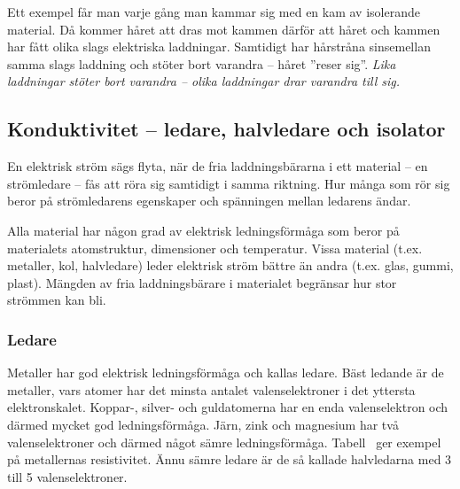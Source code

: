 Ett exempel får man varje gång man kammar sig med en kam av isolerande material.
Då kommer håret att dras mot kammen därför att håret och kammen har
fått olika slags elektriska laddningar.
Samtidigt har hårstråna sinsemellan samma slags laddning och stöter bort
varandra -- håret ''reser sig''.
\emph{Lika laddningar stöter bort varandra -- olika laddningar drar varandra till sig.}

\subsection{Konduktivitet -- ledare, halvledare och isolator}
\label{konduktivitet}

En elektrisk ström sägs flyta, när de fria laddningsbärarna i ett material -- en
strömledare -- fås att röra sig samtidigt i samma riktning.
Hur många som rör sig beror på strömledarens egenskaper och spänningen mellan
ledarens ändar.

Alla material har någon grad av elektrisk ledningsförmåga som beror på
materialets atomstruktur, dimensioner och temperatur.
Vissa material (t.ex. metaller, kol, halvledare) leder elektrisk ström bättre
än andra (t.ex. glas, gummi, plast).
Mängden av fria laddningsbärare i materialet begränsar hur stor strömmen kan
bli.

\subsubsection{Ledare}
\label{ledare}

Metaller har god elektrisk ledningsförmåga och kallas ledare.
Bäst ledande är de metaller, vars atomer har det minsta antalet
valenselektroner i det yttersta elektronskalet.
Koppar-, silver- och guldatomerna har en enda valenselektron och därmed mycket
god ledningsförmåga.
Järn, zink och magnesium har två valenselektroner och därmed något sämre
ledningsförmåga.
Tabell~ ger exempel på metallernas resistivitet.
Ännu sämre ledare är de så kallade halvledarna med 3 till 5 valenselektroner.

